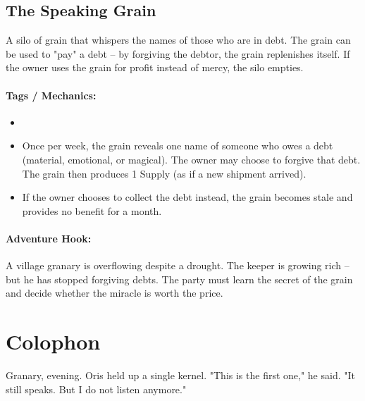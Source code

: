 \subsection*{The Speaking Grain}

A silo of grain that whispers the names of those who are in debt. The grain can be used to "pay" a debt -- by forgiving the debtor, the grain replenishes itself. If the owner uses the grain for profit instead of mercy, the silo empties.

\paragraph{Tags / Mechanics:}
\begin{itemize}
\item [HEAL] [TRUTH]
\item Once per week, the grain reveals one name of someone who owes a debt (material, emotional, or magical). The owner may choose to forgive that debt. The grain then produces 1 Supply (as if a new shipment arrived).
\item If the owner chooses to collect the debt instead, the grain becomes stale and provides no benefit for a month.
\end{itemize}

\paragraph{Adventure Hook:}
A village granary is overflowing despite a drought. The keeper is growing rich -- but he has stopped forgiving debts. The party must learn the secret of the grain and decide whether the miracle is worth the price.

\section*{Colophon}
Granary, evening. Oris held up a single kernel. "This is the first one," he said. "It still speaks. But I do not listen anymore."

